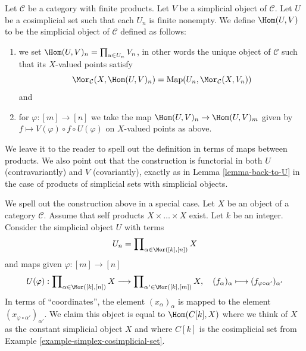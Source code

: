\begin{definition}
\label{definition-hom-deltak-simplicial}
Let $\mathcal{C}$ be a category with finite products.
Let $V$ be a simplicial object of $\mathcal{C}$.
Let $U$ be a cosimplicial set such that each $U_n$ is finite nonempty.
We define {\it $\Hom(U, V)$} to be
the simplicial object of $\mathcal{C}$ defined
as follows:
\begin{enumerate}
\item we set $\Hom(U, V)_n = \prod_{u \in U_n} V_n$,
in other words the unique object of $\mathcal{C}$ such
that its $X$-valued points satisfy
$$
\Mor_\mathcal{C}(X, \Hom(U, V)_n)
=
\text{Map}(U_n, \Mor_\mathcal{C}(X, V_n))
$$
and
\item for $\varphi : [m] \to [n]$ we take the map
$\Hom(U, V)_n \to \Hom(U, V)_m$
given by $f \mapsto V(\varphi) \circ f \circ U(\varphi)$
on $X$-valued points as above.
\end{enumerate}
\end{definition}

\noindent
We leave it to the reader to spell out the
definition in terms of maps between products.
We also point out that the construction is functorial
in both $U$ (contravariantly) and $V$ (covariantly), exactly as in
Lemma \ref{lemma-back-to-U} in the case of
products of simplicial sets with simplicial objects.

\medskip\noindent
We spell out the construction above in a special case.
Let $X$ be an object of a category $\mathcal{C}$.
Assume that self products $X \times \ldots \times X$ exist.
Let $k$ be an integer.
Consider the simplicial object $U$ with terms
$$
U_n = \prod\nolimits_{\alpha \in \Mor([k], [n])} X
$$
and maps given $\varphi : [m] \to [n]$
$$
U(\varphi) :
\prod\nolimits_{\alpha \in \Mor([k], [n])} X
\longrightarrow
\prod\nolimits_{\alpha' \in \Mor([k], [m])} X, \quad
(f_{\alpha})_{\alpha} \longmapsto
(f_{\varphi \circ \alpha'})_{\alpha'}
$$
In terms of ``coordinates'', the element $(x_\alpha)_\alpha$
is mapped to the element $(x_{\varphi \circ \alpha'})_{\alpha'}$.
We claim this object is equal to $\Hom(C[k], X)$
where we think of $X$ as the constant simplicial object $X$
and where $C[k]$ is the cosimplicial set from
Example \ref{example-simplex-cosimplicial-set}.

